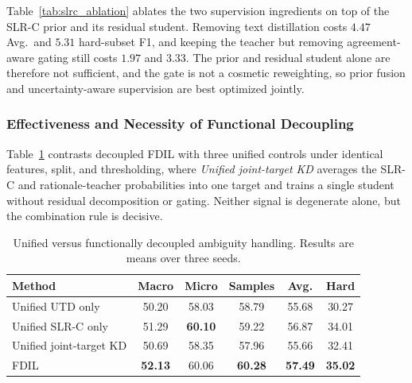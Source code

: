 Table~\ref{tab:slrc_ablation} ablates the two supervision ingredients on top of the SLR-C prior and its residual student. Removing text distillation costs $4.47$ Avg.\ and $5.31$ hard-subset F1, and keeping the teacher but removing agreement-aware gating still costs $1.97$ and $3.33$. The prior and residual student alone are therefore not sufficient, and the gate is not a cosmetic reweighting, so prior fusion and uncertainty-aware supervision are best optimized jointly.

\subsubsection{Effectiveness and Necessity of Functional Decoupling}
\label{sec:unified_vs_decoupled}
\label{sec:quadrants}

Table~\ref{tab:unified_decoupled} contrasts decoupled FDIL with three unified controls under identical features, split, and thresholding, where \textit{Unified joint-target KD} averages the SLR-C and rationale-teacher probabilities into one target and trains a single student without residual decomposition or gating. Neither signal is degenerate alone, but the combination rule is decisive.

\begin{table}[htbp]
\centering
\small
\caption{Unified versus functionally decoupled ambiguity handling. Results are means over three seeds.}
\label{tab:unified_decoupled}
\setlength{\tabcolsep}{4pt}
\begin{tabular}{lccccc}
\hline
Method & Macro & Micro & Samples & Avg. & Hard \\
\hline
Unified UTD only & 50.20 & 58.03 & 58.79 & 55.68 & 30.27 \\
Unified SLR-C only & 51.29 & \textbf{60.10} & 59.22 & 56.87 & 34.01 \\
Unified joint-target KD & 50.69 & 58.35 & 57.96 & 55.66 & 32.41 \\
FDIL & \textbf{52.13} & 60.06 & \textbf{60.28} & \textbf{57.49} & \textbf{35.02} \\
\hline
\end{tabular}
\end{table}

